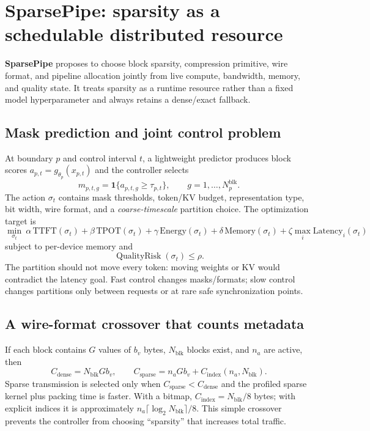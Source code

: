 \documentclass[10pt]{article}
\begin{document}
\section{SparsePipe: sparsity as a schedulable distributed resource}

\begin{methodbox}[title={Proposed adaptive systems layer}]
\textbf{SparsePipe} proposes to choose block sparsity, compression primitive, wire format, and
pipeline allocation jointly from live compute, bandwidth, memory, and quality state. It treats
sparsity as a runtime resource rather than a fixed model hyperparameter and always retains a
dense/exact fallback.
\end{methodbox}

\subsection{Mask prediction and joint control problem}

At boundary $p$ and control interval $t$, a lightweight predictor produces block scores
$a_{p,t}=g_{\theta_p}(x_{p,t})$ and the controller selects
\[
m_{p,t,g}=\mathbf1\{a_{p,t,g}\ge\tau_{p,t}\},
\qquad g=1,\ldots,N_{p}^{\mathrm{blk}}.
\]
The action $\sigma_t$ contains mask thresholds, token/KV budget, representation type, bit width,
wire format, and a \emph{coarse-timescale} partition choice. The optimization target is
\[
\min_{\sigma_t}\ 
\alpha\,\mathrm{TTFT}(\sigma_t)+\beta\,\mathrm{TPOT}(\sigma_t)
+\gamma\,\mathrm{Energy}(\sigma_t)+\delta\,\mathrm{Memory}(\sigma_t)
+\zeta\max_i\mathrm{Latency}_i(\sigma_t)
\]
subject to per-device memory and
\[
\operatorname{QualityRisk}(\sigma_t)\le\rho .
\]
The partition should not move every token: moving weights or KV would contradict the latency
goal. Fast control changes masks/formats; slow control changes partitions only between requests
or at rare safe synchronization points.

\subsection{A wire-format crossover that counts metadata}

If each block contains $G$ values of $b_v$ bytes, $N_{\mathrm{blk}}$ blocks exist, and
$n_a$ are active, then
\[
C_{\mathrm{dense}}=N_{\mathrm{blk}}Gb_v,\qquad
C_{\mathrm{sparse}}=n_aGb_v+C_{\mathrm{index}}(n_a,N_{\mathrm{blk}}).
\]
Sparse transmission is selected only when $C_{\mathrm{sparse}}<C_{\mathrm{dense}}$ and the
profiled sparse kernel plus packing time is faster. With a bitmap,
$C_{\mathrm{index}}=N_{\mathrm{blk}}/8$ bytes; with explicit indices it is approximately
$n_a\lceil\log_2N_{\mathrm{blk}}\rceil/8$. This simple crossover prevents the controller from
choosing ``sparsity'' that increases total traffic.
\end{document}
